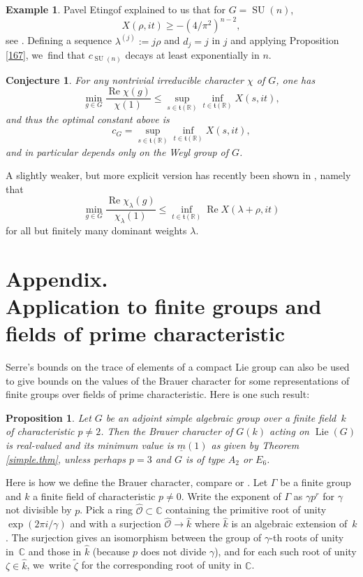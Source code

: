 \documentclass[JEP,XML,SOM,Unicode,NoFloatCountersInSection,published]{cedram}
\newtheorem{prop}[equation]{Proposition}
\newtheorem{conj}[equation]{Conjecture}
\theoremstyle{definition}
\newtheorem{example}[equation]{Example}
\newcommand{\mft}{\mathfrak{t}}
\newcommand{\R}{\mathbb{R}}
\newcommand{\C}{\mathbb{C}}
\newcommand{\mcO}{\mathcal{O}}
\newcommand{\cOh}{\hat{\mcO}}
\newcommand{\mmin}{\underline{m}}
\DeclareMathOperator{\RE}{Re}
\DeclareMathOperator{\SU}{SU}
\DeclareMathOperator{\Lie}{Lie}
\newcommand{\kh}{\hat{k}}
\begin{document}
\begin{example}
Pavel Etingof explained to us that for $G = \SU(n)$,\vspace*{-3pt}
\[
X(\rho, it) \ge -(4/\pi^2)^{n-2},
\]
see \cite[Prop.\,6.1]{EtingofRains}.
Defining a sequence $\lambda^{(j)} := j \rho$ and $d_j = j$ in $j$ and applying Proposition \ref{167}, we~find that $c_{\SU(n)}$ decays at least exponentially in $n$.
\end{example}

\begin{conj}
For any nontrivial irreducible character $\chi$ of $G$, one has\vspace*{-3pt}
\[
\min_{g\in G} \frac{\RE\chi(g)}{\chi(1)}
\le
\sup_{s\in \mft(\R)}
\inf_{t\in \mft(\R)}
X(s,it),
\]
and thus the optimal constant above is\vspace*{-3pt}
\[
c_G = \sup_{s\in \mft(\R)}
\inf_{t\in \mft(\R)}
X(s,it),
\]
and in particular depends only on the Weyl group of $G$.
\end{conj}

A slightly weaker, but more explicit version has recently been shown in \cite[Cor.\,1.4]{EtingofRains}, namely that\vspace*{-5pt}
\[
\min_{g\in G} \frac{\RE\chi_\lambda(g)}{\chi_\lambda(1)}
\le
\inf_{t\in \mft(\R)} \RE X(\lambda+\rho,it)
\]
for all but finitely many dominant weights $\lambda$.

\appendix
\part*{Appendix.\texorpdfstring{\\}{} Application to finite groups and fields of prime characteristic}

Serre’s bounds on the trace of elements of a compact Lie group can also be used to give bounds on the values of the Brauer character for some representations of finite groups over fields of prime characteristic. Here is one such result:

\begin{prop} \label{Brauer.adj}
Let $G$ be an adjoint simple algebraic group over a finite field~$k$ of characteristic $p \ne 2$. Then the Brauer character of $G(k)$ acting on $\Lie(G)$ is real-valued and its minimum value is $\mmin(1)$ as given by Theorem \ref{simple.thm}, unless perhaps $p = 3$ and $G$ is of type $A_2$ or $E_6$.
\end{prop}

Here is how we define the Brauer character, compare \cite[\S18.1]{Se:rep} or \cite[\S5.3]{Benson1}. Let $\Gamma$ be a finite group and $k$ a finite field of characteristic $p \ne 0$. Write the exponent of $\Gamma$ as $\gamma p^r$ for $\gamma$ not divisible by $p$. Pick a ring $\cOh \subset \C$ containing the primitive root of unity $\exp(2\pi i/\gamma)$ and with a surjection $\cOh \to \kh$ where $\kh$ is an algebraic extension of~$k$. The surjection gives an isomorphism between the group of $\gamma$-th roots of unity in~$\C$ and those in $\kh$ (because $p$ does not divide $\gamma$), and for each such root of unity \hbox{$\zeta \in \kh$}, we~write $\tilde{\zeta}$ for the corresponding root of unity in $\C$.
\end{document}

